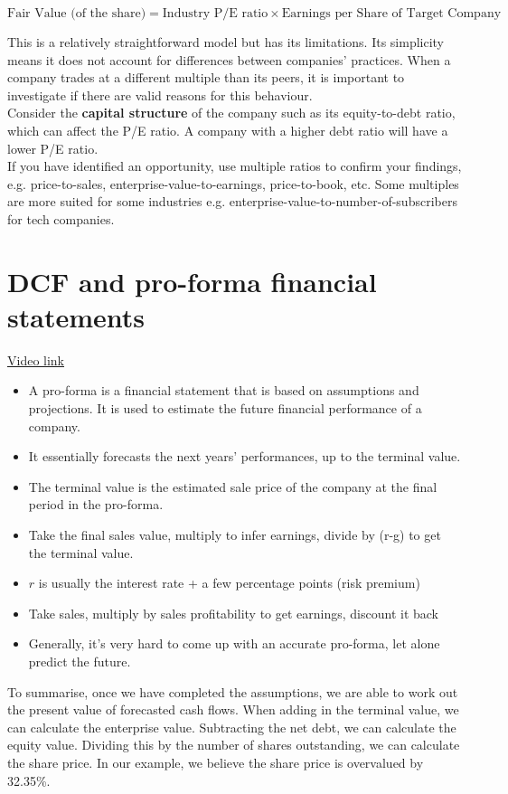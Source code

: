\begin{equation}
    \text{Fair Value (of the share)} = \text{Industry P/E ratio} \times \text{Earnings per Share of Target Company}
\end{equation}

This is a relatively straightforward model but has its limitations. Its simplicity means it does not account for differences between companies' practices. When a company trades at a different multiple than its peers, it is important to investigate if there are valid reasons for this behaviour.\\

Consider the \textbf{capital structure} of the company such as its equity-to-debt ratio, which can affect the P/E ratio. A company with a higher debt ratio will have a lower P/E ratio.\\

If you have identified an opportunity, use multiple ratios to confirm your findings, e.g. price-to-sales, enterprise-value-to-earnings, price-to-book, etc. Some multiples are more suited for some industries e.g. enterprise-value-to-number-of-subscribers for tech companies.

\section{DCF and pro-forma financial statements}
\href{https://youtu.be/ynlAcc99b4c}{Video link}

\begin{itemize}
    \item A pro-forma is a financial statement that is based on assumptions and projections. It is used to estimate the future financial performance of a company.
    \item It essentially forecasts the next years' performances, up to the terminal value.
    \item The terminal value is the estimated sale price of the company at the final period in the pro-forma.
    \item Take the final sales value, multiply to infer earnings, divide by (r-g) to get the terminal value.
    \item $r$ is usually the interest rate + a few percentage points (risk premium)
    \item Take sales, multiply by sales profitability to get earnings, discount it back
    \item Generally, it's very hard to come up with an accurate pro-forma, let alone predict the future.
\end{itemize}

To summarise, once we have completed the assumptions, we are able to work out the present value of forecasted cash flows. When adding in the terminal value, we can calculate the enterprise value. Subtracting the net debt, we can calculate the equity value. Dividing this by the number of shares outstanding, we can calculate the share price. In our example, we believe the share price is overvalued by 32.35\%.

